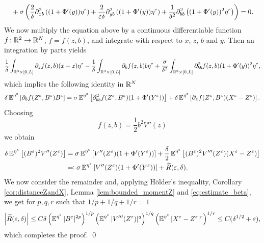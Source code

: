 \documentclass[10pt]{article}
\begin{document}
\begin{appendices}
\begin{equation}
\begin{aligned}
	&\quad + \sigma \left( \frac2\delta \partial_{xb}^2 \left( (1+\Phi'(y)) \eta^\varepsilon \right) + \frac2{\varepsilon\delta}\partial_{yb}^2 \left( (1+\Phi'(y))\eta^\varepsilon \right) + \frac1{\delta^2}\partial_{bb}^2 \left( (1+\Phi'(y))^2 \eta^\varepsilon \right) \right) = 0.
	\end{aligned}
	\end{equation}
	We now multiply the equation above by a continuous differentiable function $f \colon \mathbb{R}^2 \to \mathbb{R}^N$, $f = f(z,b)$, and integrate with respect to $x$, $z$, $b$ and $y$. Then an integration by parts yields
	\begin{equation}
	\frac1\delta \int_{\mathbb{R}^3 \times [0,L]} \partial_z f(z,b) (x-z) \eta^\varepsilon - \frac1\delta \int_{\mathbb{R}^3 \times [0,L]} \partial_b f(z,b) b \eta^\varepsilon + \frac{\sigma}{\delta^2} \int_{\mathbb{R}^3 \times [0,L]} \partial_{bb}^2 f(z,b) (1+\Phi'(y))^2 \eta^\varepsilon,
	\end{equation}
	which implies the following identity in $\mathbb{R}^N$
	\begin{equation}
	\delta \operatorname{\mathbb{E}}^{\eta^\varepsilon}\left[ \partial_b f(Z^\varepsilon, B^\varepsilon) B^\varepsilon \right] = \sigma \operatorname{\mathbb{E}}^{\eta^\varepsilon} \left[ \partial_{bb}^2 f(Z^\varepsilon, B^\varepsilon) (1+\Phi'(Y^\varepsilon)) \right] + \delta \operatorname{\mathbb{E}}^{\eta^\varepsilon} \left[ \partial_z f(Z^\varepsilon, B^\varepsilon) (X^\varepsilon-Z^\varepsilon) \right].
	\end{equation}
	Choosing
	\begin{equation}
	f(z,b) = \frac12 b^2 V''(z)
	\end{equation}
	we obtain
	\begin{equation}
	\begin{aligned}
	\delta \operatorname{\mathbb{E}}^{\eta^\varepsilon}\left[ (B^\varepsilon)^2 V''(Z^\varepsilon) \right] &= \sigma \operatorname{\mathbb{E}}^{\eta^\varepsilon} \left[ V''(Z^\varepsilon) (1+\Phi'(Y^\varepsilon)) \right] + \frac\delta2 \operatorname{\mathbb{E}}^{\eta^\varepsilon} \left[ (B^\varepsilon)^2 V'''(Z^\varepsilon) (X^\varepsilon-Z^\varepsilon) \right] \\
	&\eqqcolon \sigma \operatorname{\mathbb{E}}^{\eta^\varepsilon} \left[ V''(Z^\varepsilon) (1+\Phi'(Y^\varepsilon)) \right] + \widetilde R(\varepsilon,\delta).
	\end{aligned}
	\end{equation}
	We now consider the remainder and, applying Hölder's inequality, Corollary \ref{cor:distanceZandX}, Lemma \ref{lem:bounded_momentZ} and \eqref{eq:estimate_beta}, we get for $p,q,r$ such that $1/p+1/q+1/r=1$
	\begin{equation}
	\left| \widetilde R(\varepsilon,\delta) \right| \le C \delta \left( \operatorname{\mathbb{E}}^{\eta^\varepsilon} |B^\varepsilon|^{2p} \right)^{1/p} \left( \operatorname{\mathbb{E}}^{\eta^\varepsilon} |V'''(Z^\varepsilon)|^q \right)^{1/q} \left( \operatorname{\mathbb{E}}^{\eta^\varepsilon} |X^\varepsilon - Z^\varepsilon|^r \right)^{1/r} \le C (\delta^{1/2} + \varepsilon),
	\end{equation}
	which completes the proof. \qed 


\end{appendices}
\end{document}
